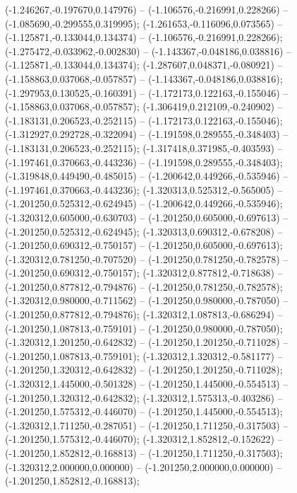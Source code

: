  (-1.246267,-0.197670,0.147976) -- (-1.106576,-0.216991,0.228266) -- (-1.085690,-0.299555,0.319995);
 (-1.261653,-0.116096,0.073565) -- (-1.125871,-0.133044,0.134374) -- (-1.106576,-0.216991,0.228266);
 (-1.275472,-0.033962,-0.002830) -- (-1.143367,-0.048186,0.038816) -- (-1.125871,-0.133044,0.134374);
 (-1.287607,0.048371,-0.080921) -- (-1.158863,0.037068,-0.057857) -- (-1.143367,-0.048186,0.038816);
 (-1.297953,0.130525,-0.160391) -- (-1.172173,0.122163,-0.155046) -- (-1.158863,0.037068,-0.057857);
 (-1.306419,0.212109,-0.240902) -- (-1.183131,0.206523,-0.252115) -- (-1.172173,0.122163,-0.155046);
 (-1.312927,0.292728,-0.322094) -- (-1.191598,0.289555,-0.348403) -- (-1.183131,0.206523,-0.252115);
 (-1.317418,0.371985,-0.403593) -- (-1.197461,0.370663,-0.443236) -- (-1.191598,0.289555,-0.348403);
 (-1.319848,0.449490,-0.485015) -- (-1.200642,0.449266,-0.535946) -- (-1.197461,0.370663,-0.443236);
 (-1.320313,0.525312,-0.565005) -- (-1.201250,0.525312,-0.624945) -- (-1.200642,0.449266,-0.535946);
 (-1.320312,0.605000,-0.630703) -- (-1.201250,0.605000,-0.697613) -- (-1.201250,0.525312,-0.624945);
 (-1.320313,0.690312,-0.678208) -- (-1.201250,0.690312,-0.750157) -- (-1.201250,0.605000,-0.697613);
 (-1.320312,0.781250,-0.707520) -- (-1.201250,0.781250,-0.782578) -- (-1.201250,0.690312,-0.750157);
 (-1.320312,0.877812,-0.718638) -- (-1.201250,0.877812,-0.794876) -- (-1.201250,0.781250,-0.782578);
 (-1.320312,0.980000,-0.711562) -- (-1.201250,0.980000,-0.787050) -- (-1.201250,0.877812,-0.794876);
 (-1.320312,1.087813,-0.686294) -- (-1.201250,1.087813,-0.759101) -- (-1.201250,0.980000,-0.787050);
 (-1.320312,1.201250,-0.642832) -- (-1.201250,1.201250,-0.711028) -- (-1.201250,1.087813,-0.759101);
 (-1.320312,1.320312,-0.581177) -- (-1.201250,1.320312,-0.642832) -- (-1.201250,1.201250,-0.711028);
 (-1.320312,1.445000,-0.501328) -- (-1.201250,1.445000,-0.554513) -- (-1.201250,1.320312,-0.642832);
 (-1.320312,1.575313,-0.403286) -- (-1.201250,1.575312,-0.446070) -- (-1.201250,1.445000,-0.554513);
 (-1.320312,1.711250,-0.287051) -- (-1.201250,1.711250,-0.317503) -- (-1.201250,1.575312,-0.446070);
 (-1.320312,1.852812,-0.152622) -- (-1.201250,1.852812,-0.168813) -- (-1.201250,1.711250,-0.317503);
 (-1.320312,2.000000,0.000000) -- (-1.201250,2.000000,0.000000) -- (-1.201250,1.852812,-0.168813);
